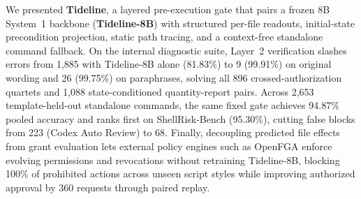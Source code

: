 \documentclass[sigconf,anonymous,nonacm]{acmart}
\begin{document}
We presented \textbf{Tideline}, a layered pre-execution gate that pairs a frozen 8B System~1 backbone (\textbf{Tideline-8B}) with structured per-file readouts, initial-state precondition projection, static path tracing, and a context-free standalone command fallback. On the internal diagnostic suite, Layer~2 verification slashes errors from 1,885 with Tideline-8B alone (81.83\%) to 9 (99.91\%) on original wording and 26 (99.75\%) on paraphrases, solving all 896 crossed-authorization quartets and 1,088 state-conditioned quantity-report pairs. Across 2,653 template-held-out standalone commands, the same fixed gate achieves 94.87\% pooled accuracy and ranks first on ShellRisk-Bench (95.30\%), cutting false blocks from 223 (Codex Auto Review) to 68. Finally, decoupling predicted file effects from grant evaluation lets external policy engines such as OpenFGA enforce evolving permissions and revocations without retraining Tideline-8B, blocking 100\% of prohibited actions across unseen script styles while improving authorized approval by 360 requests through paired replay.





\end{document}
